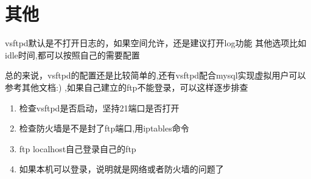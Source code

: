 \documentclass[adobefonts]{ctexart}
\begin{document}
\section{其他}
vsftpd默认是不打开日志的，如果空间允许，还是建议打开log功能
其他选项比如idle时间,都可以按照自己的需要配置

总的来说，vsftpd的配置还是比较简单的,还有vsftpd配合mysql实现虚拟用户可以参考其他文档:)
,如果自己建立的ftp不能登录，可以这样逐步排查
\begin{enumerate}
\item 检查vsftpd是否启动，坚持21端口是否打开
\item 检查防火墙是不是封了ftp端口,用iptables命令
\item ftp localhost自己登录自己的ftp
\item 如果本机可以登录，说明就是网络或者防火墙的问题了
\end{enumerate}

\end{document}
